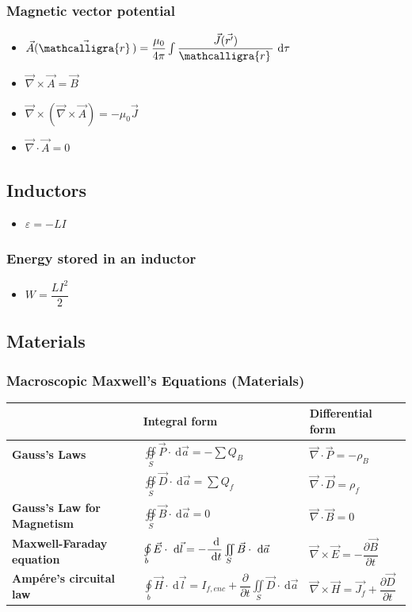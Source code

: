 \documentclass[]{report}
\newcommand \tab[1][1cm]{\hspace*{#1}}
\newcommand{\dn}[1]{\ \mathrm{d}#1}
\newcommand{\dd}[2]{ \dfrac{\dn #1}{\dn #2}}
\newcommand{\pp}[2]{\dfrac{\partial #1}{\partial #2}}
\newcommand{\curl}{\vec{\nabla}\times}
\newcommand{\divergence}{\vec{\nabla}\cdot}
\newcommand{\itemt}{\item \tab}
\newcommand{\scriptr}{\mathcalligra{r}\,}
\begin{document}
\subsubsection{Magnetic vector potential}
\begin{itemize}
\itemt \( \vec{A}(\vec{\scriptr}) = \dfrac{\mu_0}{4\pi} \int \dfrac{\vec{J}(\vec{r'})}{\scriptr} \dn \tau \)
\itemt \( \curl\vec{A} = \vec{B} \)
\itemt \( \vec{\nabla} \times (\vec{\nabla} \times \vec{A}) = -\mu_0 \vec{J} \)
\itemt \( \divergence\vec{A} = 0 \)
\end{itemize}

		\subsection{Inductors}
        
\begin{itemize}
\itemt \( \varepsilon = - LI \)
\end{itemize}
        
\subsubsection{Energy stored in an inductor}  
\begin{itemize}
\itemt \( W = \dfrac{LI^2}{2} \)
\end{itemize}

		\subsection{Materials}

\subsubsection{Macroscopic Maxwell's Equations (Materials)}

\def\arraystretch{2.5}
\begin{tabular}{ |l|l|l| } 
\hline
					
  &	\textbf{Integral form}	& 	\textbf{Differential form}
\\ \hline

\textbf{Gauss's Laws}	
&\( \oiint\limits_{S} \vec{P} \cdot \dn\vec{a} = -\sum Q_B \)	
& \( \divergence \vec{P} = -\rho_B \)
\\
& \( \oiint\limits_{S} \vec{D}\cdot\dn\vec{a} = \sum Q_f \) 
& \( \divergence \vec{D} = \rho_f \)
\\ \hline

\textbf{Gauss's Law for Magnetism}	
&\( \oiint\limits_{S} \vec{B} \cdot \dn\vec{a} = 0 \)
&\( \divergence \vec{B} = 0 \)
\\ \hline

\textbf{Maxwell-Faraday equation}	
&\( \oint\limits_{b} \vec{E} \cdot \dn\vec{l} = -\dd{}{t} \iint\limits_S \vec{B} \cdot \dn\vec{a}\)	
&\( \curl \vec{E} = -\pp{\vec{B}}{t} \)
\\ \hline

\textbf{Amp\'ere's circuital law}	
& \( \oint\limits_{b} \vec{H} \cdot \dn\vec{l} = I_{f,enc} + \pp{}{t} \iint\limits_S \vec{D}\cdot \dn \vec{a}\)	
&\( \curl \vec{H} = \vec{J_f} + \pp{\vec{D}}{t} \)
\\ \hline
\end{tabular}
\end{document}
